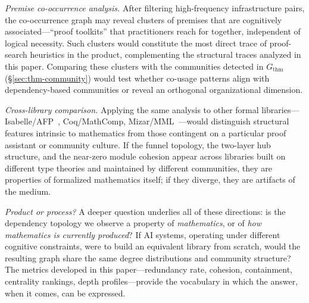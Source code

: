 \emph{Premise co-occurrence analysis.} After filtering high-frequency infrastructure pairs, the co-occurrence graph may reveal clusters of premises that are cognitively associated---``proof toolkits'' that practitioners reach for together, independent of logical necessity. Such clusters would constitute the most direct trace of proof-search heuristics in the product, complementing the structural traces analyzed in this paper. Comparing these clusters with the communities detected in $G_{\mathrm{thm}}$ (\S\ref{sec:thm-community}) would test whether co-usage patterns align with dependency-based communities or reveal an orthogonal organizational dimension.

\emph{Cross-library comparison.} Applying the same analysis to other formal libraries---Isabelle/AFP~\cite{blanchette2015,klein2012}, Coq/MathComp, Mizar/MML~\cite{bancerek2018}---would distinguish structural features intrinsic to mathematics from those contingent on a particular proof assistant or community culture. If the funnel topology, the two-layer hub structure, and the near-zero module cohesion appear across libraries built on different type theories and maintained by different communities, they are properties of formalized mathematics itself; if they diverge, they are artifacts of the medium.

\emph{Product or process?} A deeper question underlies all of these directions: is the dependency topology we observe a property of \emph{mathematics}, or of \emph{how mathematics is currently produced}? If AI systems, operating under different cognitive constraints, were to build an equivalent library from scratch, would the resulting graph share the same degree distributions and community structure? The metrics developed in this paper---redundancy rate, cohesion, containment, centrality rankings, depth profiles---provide the vocabulary in which the answer, when it comes, can be expressed.
